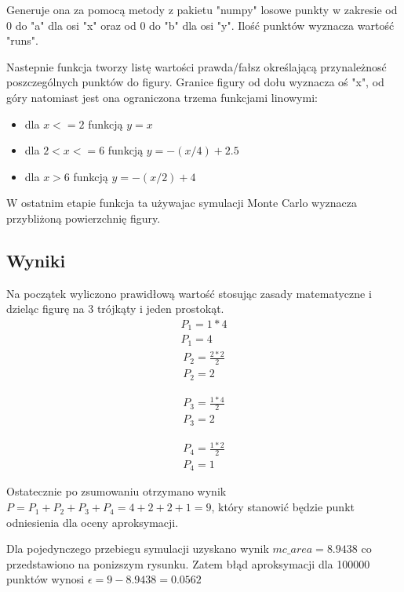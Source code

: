 \documentclass[12pt,oneside,a4paper]{book} %
\theoremstyle{break}
\begin{document}
Generuje ona za pomocą metody z pakietu "numpy" losowe punkty w zakresie od 0 do "a" dla osi "x" oraz od 0 do "b" dla osi "y". Ilość punktów wyznacza wartość "runs".

Nastepnie funkcja tworzy listę wartości prawda/fałsz określającą przynależnosć poszczególnych punktów do figury. Granice figury od dołu wyznacza oś "x", od góry natomiast jest ona ograniczona trzema funkcjami linowymi:

\begin{itemize}
  \item dla $x <= 2$ funkcją $y = x$
  \item dla $2 < x <= 6$ funkcją $y = -(x/4) + 2.5 $
  \item dla $x > 6$ funkcją $y = -(x/2) + 4$
\end{itemize}

W ostatnim etapie funkcja ta używajac symulacji Monte Carlo wyznacza przybliżoną powierzchnię figury.

\subsection*{Wyniki}

Na początek wyliczono prawidłową wartość stosując zasady matematyczne i dzieląc figurę na 3 trójkąty i jeden prostokąt.
\begin{gather*}
  P_1 = 1 * 4\\
  P_1 = 4
\end{gather*}
\begin{gather*}
  P_2 = \frac{2 * 2}{2} \\
  P_2 = 2
\end{gather*}

\begin{gather*}
  P_3 = \frac{1 * 4}{2} \\
  P_3 = 2
\end{gather*}

\begin{gather*}
  P_4 = \frac{1 * 2}{2} \\
  P_4 = 1
\end{gather*}

Ostatecznie po zsumowaniu otrzymano wynik $P = P_1 + P_2 + P_3 + P_4 = 4 + 2 + 2 + 1 = 9$, który stanowić będzie punkt odniesienia dla oceny aproksymacji.

Dla pojedynczego przebiegu symulacji uzyskano wynik $mc\_area = 8.9438$ co przedstawiono na ponizszym rysunku. Zatem błąd aproksymacji dla 100000 punktów wynosi $\epsilon = 9 - 8.9438 = 0.0562$
\end{document}
